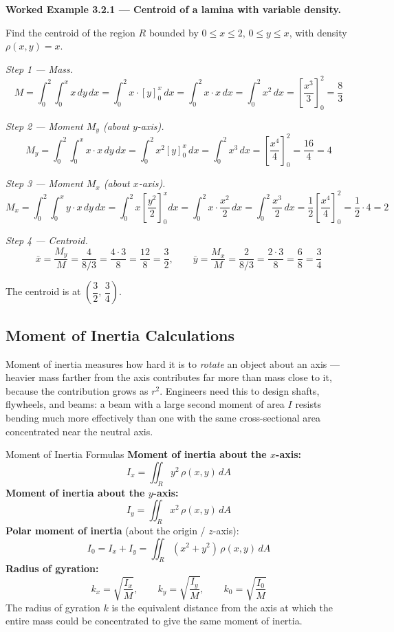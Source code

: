 \documentclass[12pt,a4paper]{article}
\begin{document}
\textbf{Worked Example 3.2.1 --- Centroid of a lamina with variable density.}

Find the centroid of the region \(R\) bounded by \(0 \leq x \leq 2\), \(0 \leq y \leq x\), with density \(\rho(x,y) = x\).

\textit{Step 1 --- Mass.}
\[
M = \int_0^2 \int_0^x x\,dy\,dx
= \int_0^2 x \cdot [y]_0^x\,dx
= \int_0^2 x \cdot x\,dx
= \int_0^2 x^2\,dx
= \left[\frac{x^3}{3}\right]_0^2
= \frac{8}{3}
\]

\textit{Step 2 --- Moment \(M_y\) (about \(y\)-axis).}
\[
M_y = \int_0^2 \int_0^x x \cdot x\,dy\,dx
= \int_0^2 x^2 [y]_0^x\,dx
= \int_0^2 x^3\,dx
= \left[\frac{x^4}{4}\right]_0^2
= \frac{16}{4} = 4
\]

\textit{Step 3 --- Moment \(M_x\) (about \(x\)-axis).}
\[
M_x = \int_0^2 \int_0^x y \cdot x\,dy\,dx
= \int_0^2 x \left[\frac{y^2}{2}\right]_0^x dx
= \int_0^2 x \cdot \frac{x^2}{2}\,dx
= \int_0^2 \frac{x^3}{2}\,dx
= \frac{1}{2}\left[\frac{x^4}{4}\right]_0^2
= \frac{1}{2} \cdot 4 = 2
\]

\textit{Step 4 --- Centroid.}
\[
\bar{x} = \frac{M_y}{M} = \frac{4}{8/3} = \frac{4 \cdot 3}{8} = \frac{12}{8} = \frac{3}{2}, \qquad
\bar{y} = \frac{M_x}{M} = \frac{2}{8/3} = \frac{2 \cdot 3}{8} = \frac{6}{8} = \frac{3}{4}
\]

The centroid is at \(\left(\dfrac{3}{2},\, \dfrac{3}{4}\right)\).

\subsection{Moment of Inertia Calculations}

Moment of inertia measures how hard it is to \emph{rotate} an object about an axis --- heavier mass farther from the axis contributes far more than mass close to it, because the contribution grows as \(r^2\). Engineers need this to design shafts, flywheels, and beams: a beam with a large second moment of area \(I\) resists bending much more effectively than one with the same cross-sectional area concentrated near the neutral axis.

\begin{infobox}{Moment of Inertia Formulas}
\textbf{Moment of inertia about the \(x\)-axis:}
\[
I_x = \iint_R y^2\,\rho(x,y)\,dA
\]
\textbf{Moment of inertia about the \(y\)-axis:}
\[
I_y = \iint_R x^2\,\rho(x,y)\,dA
\]
\textbf{Polar moment of inertia} (about the origin / \(z\)-axis):
\[
I_0 = I_x + I_y = \iint_R (x^2 + y^2)\,\rho(x,y)\,dA
\]
\textbf{Radius of gyration:}
\[
k_x = \sqrt{\frac{I_x}{M}}, \qquad k_y = \sqrt{\frac{I_y}{M}}, \qquad k_0 = \sqrt{\frac{I_0}{M}}
\]
The radius of gyration \(k\) is the equivalent distance from the axis at which the entire mass could be concentrated to give the same moment of inertia.
\end{infobox}
\end{document}
